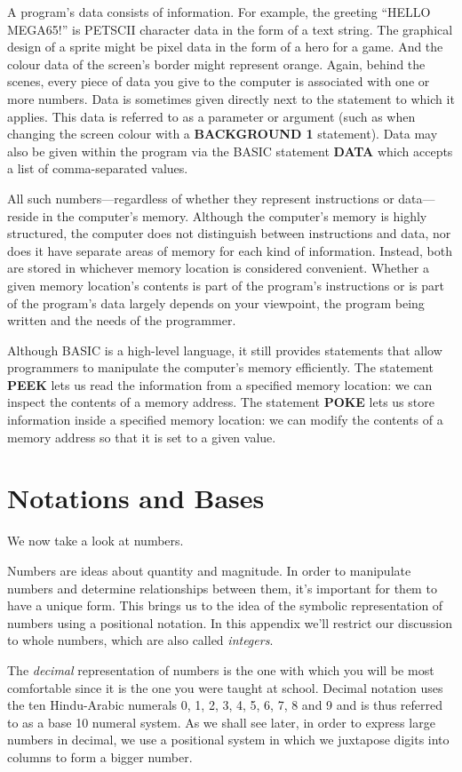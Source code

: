 A program’s data consists of information. For example, the greeting ``HELLO MEGA65!'' is PETSCII character data in the form of a text string. The graphical design of a sprite might be pixel data in the form of a hero for a game. And the colour data of the screen’s border might represent orange. Again, behind the scenes, every piece of data you give to the computer is associated with one or more numbers. Data is sometimes given directly next to the statement to which it applies. This data is referred to as a parameter or argument (such as when changing the screen colour with a {\bf BACKGROUND 1} statement). Data may also be given within the program via the BASIC statement {\bf DATA} which accepts a list of comma-separated values.

All such numbers---regardless of whether they represent instructions or data---reside in the computer’s memory. Although the computer’s memory is highly structured, the computer does not distinguish between instructions and data, nor does it have separate areas of memory for each kind of information. Instead, both are stored in whichever memory location is considered convenient. Whether a given memory location’s contents is part of the program’s instructions or is part of the program’s data largely depends on your viewpoint, the program being written and the needs of the programmer.

Although BASIC is a high-level language, it still provides statements that allow programmers to manipulate the computer’s memory efficiently. The statement {\bf PEEK} lets us read the information from a specified memory location: we can inspect the contents of a memory address. The statement {\bf POKE} lets us store information inside a specified memory location: we can modify the contents of a memory address so that it is set to a given value.

\section{Notations and Bases}
We now take a look at numbers.

Numbers are ideas about quantity and magnitude. In order to manipulate numbers and determine relationships between them, it’s important for them to have a unique form. This brings us to the idea of the symbolic representation of numbers using a positional notation. In this appendix we’ll restrict our discussion to whole numbers, which are also called {\it integers}.

The {\it decimal} representation of numbers is the one with which you will be most comfortable since it is the one you were taught at school. Decimal notation uses the ten Hindu-Arabic numerals 0, 1, 2, 3, 4, 5, 6, 7, 8 and 9 and is thus referred to as a base 10 numeral system. As we shall see later, in order to express large numbers in decimal, we use a positional system in which we juxtapose digits into columns to form a bigger number.

